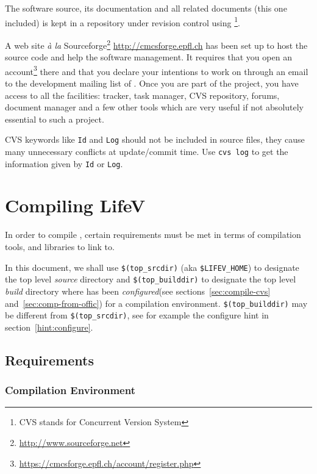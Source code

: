 The software source, its documentation and all related documents (this
one included) is kept in a repository under revision control
using \footnote{CVS stands for Concurrent Version System}.


A web site {\it\`a la} Sourceforge\footnote{\url{http://www.sourceforge.net}} \url{http://cmcsforge.epfl.ch} has been set up to host the source code and help the software management.
It requires that you open an account\footnote{\url{https://cmcsforge.epfl.ch/account/register.php}} there and that you declare your intentions to work on \lifev through an email to the development mailing list of \lifev.
Once you are part of the project, you have access to all the facilities: tracker, task manager, CVS repository, forums, document manager and a few other tools which are very useful if not absolutely essential to such a project.

CVS keywords like \verb!Id! and \verb!Log! should not be included in source files,
they cause many unnecessary conflicts at update/commit time. Use
\verb!cvs log! to get the information given by \verb!Id! or \verb!Log!.

\section{Compiling LifeV}
\label{compile-lifev}

In order to compile \lifev, certain requirements must be met in terms
of compilation tools, and libraries to link to.

\noindent In this document, we shall use \verb+$(top_srcdir)+ (aka \verb+$LIFEV_HOME+) to designate the top level \emph{source} directory
and \verb+$(top_builddir)+ to designate the top level \emph{build}
directory where \lifev has been \emph{configured}(see
sections~\ref{sec:compile-cvs} and~\ref{sec:comp-from-offic}) for a
compilation environment.  \verb+$(top_builddir)+ may be different from
\verb+$(top_srcdir)+, see for example the configure hint in
section~\ref{hint:configure}.

\subsection{Requirements}

\subsubsection{Compilation Environment}
\label{sec:comp-envir}

